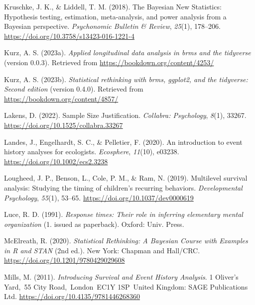 \documentclass[
  english,
  man, donotrepeattitle,floatsintext]{apa6}
\newlength{\cslhangindent}
\newenvironment{CSLReferences}[2] %
 {\begin{list}{}{%
  \setlength{\itemindent}{0pt}
  \setlength{\leftmargin}{0pt}
  \setlength{\parsep}{0pt}
  \ifodd #1
   \setlength{\leftmargin}{\cslhangindent}
   \setlength{\itemindent}{-1\cslhangindent}
  \fi
  \setlength{\itemsep}{#2\baselineskip}}}
 {\end{list}}
\begin{document}
\begin{CSLReferences}{1}{0}
Kruschke, J. K., \& Liddell, T. M. (2018). The {Bayesian New Statistics}: {Hypothesis} testing, estimation, meta-analysis, and power analysis from a {Bayesian} perspective. \emph{Psychonomic Bulletin \& Review}, \emph{25}(1), 178--206. \url{https://doi.org/10.3758/s13423-016-1221-4}

Kurz, A. S. (2023a). \emph{Applied longitudinal data analysis in brms and the tidyverse} (version 0.0.3). Retrieved from \url{https://bookdown.org/content/4253/}

Kurz, A. S. (2023b). \emph{Statistical rethinking with brms, ggplot2, and the tidyverse: {Second} edition} (version 0.4.0). Retrieved from \url{https://bookdown.org/content/4857/}

Lakens, D. (2022). Sample {Size Justification}. \emph{Collabra: Psychology}, \emph{8}(1), 33267. \url{https://doi.org/10.1525/collabra.33267}

Landes, J., Engelhardt, S. C., \& Pelletier, F. (2020). An introduction to event history analyses for ecologists. \emph{Ecosphere}, \emph{11}(10), e03238. \url{https://doi.org/10.1002/ecs2.3238}

Lougheed, J. P., Benson, L., Cole, P. M., \& Ram, N. (2019). Multilevel survival analysis: {Studying} the timing of children's recurring behaviors. \emph{Developmental Psychology}, \emph{55}(1), 53--65. \url{https://doi.org/10.1037/dev0000619}

Luce, R. D. (1991). \emph{Response times: Their role in inferring elementary mental organization} (1. issued as paperback). Oxford: Univ. Press.

McElreath, R. (2020). \emph{Statistical {Rethinking}: {A Bayesian Course} with {Examples} in {R} and {STAN}} (2nd ed.). New York: {Chapman and Hall/CRC}. \url{https://doi.org/10.1201/9780429029608}

Mills, M. (2011). \emph{Introducing {Survival} and {Event History Analysis}}. 1 Oliver's Yard,~55 City Road,~London~EC1Y 1SP~United Kingdom: SAGE Publications Ltd. \url{https://doi.org/10.4135/9781446268360}


\end{CSLReferences}
\end{document}
